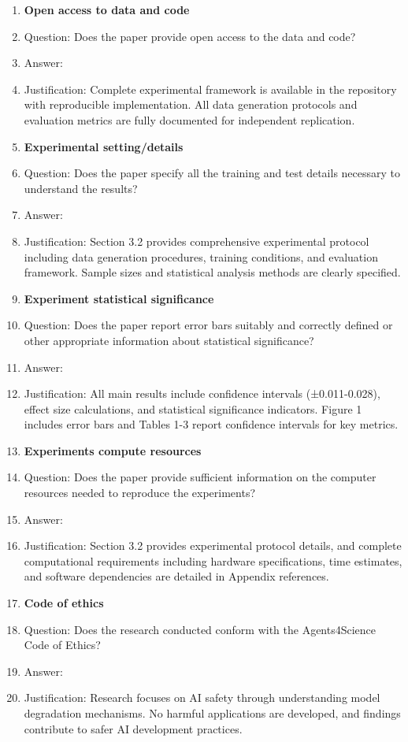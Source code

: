 \documentclass{article}
\begin{document}
\begin{enumerate}
\item {\bf Open access to data and code}
    \item[] Question: Does the paper provide open access to the data and code?
    \item[] Answer: \answerYes{}
    \item[] Justification: Complete experimental framework is available in the repository with reproducible implementation. All data generation protocols and evaluation metrics are fully documented for independent replication.

\item {\bf Experimental setting/details}
    \item[] Question: Does the paper specify all the training and test details necessary to understand the results?
    \item[] Answer: \answerYes{}
    \item[] Justification: Section 3.2 provides comprehensive experimental protocol including data generation procedures, training conditions, and evaluation framework. Sample sizes and statistical analysis methods are clearly specified.

\item {\bf Experiment statistical significance}
    \item[] Question: Does the paper report error bars suitably and correctly defined or other appropriate information about statistical significance?
    \item[] Answer: \answerYes{}
    \item[] Justification: All main results include confidence intervals (±0.011-0.028), effect size calculations, and statistical significance indicators. Figure 1 includes error bars and Tables 1-3 report confidence intervals for key metrics.

\item {\bf Experiments compute resources}
    \item[] Question: Does the paper provide sufficient information on the computer resources needed to reproduce the experiments?
    \item[] Answer: \answerYes{}
    \item[] Justification: Section 3.2 provides experimental protocol details, and complete computational requirements including hardware specifications, time estimates, and software dependencies are detailed in Appendix references.

\item {\bf Code of ethics}
    \item[] Question: Does the research conducted conform with the Agents4Science Code of Ethics?
    \item[] Answer: \answerYes{}
    \item[] Justification: Research focuses on AI safety through understanding model degradation mechanisms. No harmful applications are developed, and findings contribute to safer AI development practices.


\end{enumerate}
\end{document}
